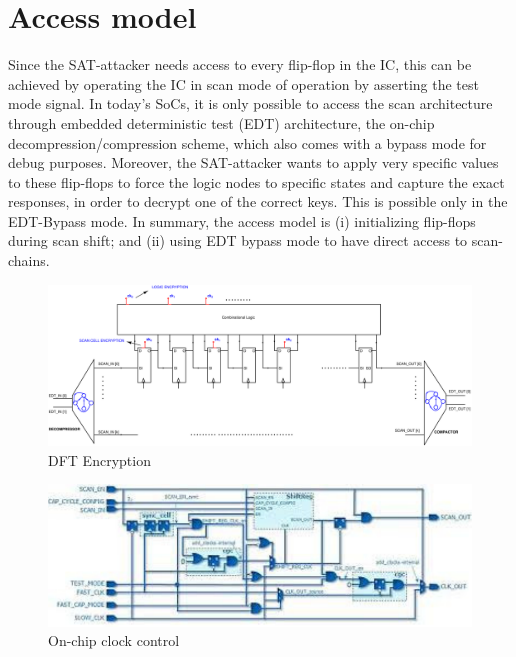 \section{Access model}

\noindent Since the SAT-attacker needs access to every flip-flop in the IC, this can be achieved by operating the IC in scan mode of operation by asserting the test mode signal. In today's SoCs, it is only possible to access the scan architecture through embedded deterministic test (EDT) architecture, the on-chip decompression/compression scheme, which also comes with a bypass mode for debug purposes. Moreover, the SAT-attacker wants to apply very specific values to these flip-flops to force the logic nodes to specific states and capture the exact responses, in order to decrypt one of the correct keys. This is possible only in the EDT-Bypass mode. In summary, the access model is (i) initializing flip-flops during scan shift; and (ii) using EDT bypass mode to have direct access to scan-chains. 

\begin{figure}
\centering
\includegraphics[scale=0.14]{fig/encrypted-DFT.pdf}
\caption{DFT Encryption}
\label{fig:encrypted-DFT}
\end{figure}


\begin{figure}
\centering
\includegraphics[scale=0.6]{fig/occ.pdf}
\caption{On-chip clock control}
\label{fig:occ}
\end{figure}


